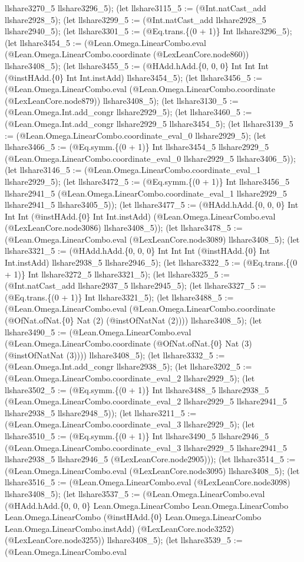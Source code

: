 \documentclass[11pt]{article}
\begin{document}
llshare3270\_5 llshare3296\_5); (let llshare3115\_5 := (@Int.natCast\_add llshare2928\_5); (let llshare3299\_5 := (@Int.natCast\_add llshare2928\_5 llshare2940\_5); (let llshare3301\_5 := (@Eq.trans.\{(0 + 1)\} Int llshare3296\_5); (let llshare3454\_5 := (@Lean.Omega.LinearCombo.eval (@Lean.Omega.LinearCombo.coordinate (@LexLeanCore.node860)) llshare3408\_5); (let llshare3455\_5 := (@HAdd.hAdd.\{0, 0, 0\} Int Int Int (@instHAdd.\{0\} Int Int.instAdd) llshare3454\_5); (let llshare3456\_5 := (@Lean.Omega.LinearCombo.eval (@Lean.Omega.LinearCombo.coordinate (@LexLeanCore.node879)) llshare3408\_5); (let llshare3130\_5 := (@Lean.Omega.Int.add\_congr llshare2929\_5); (let llshare3460\_5 := (@Lean.Omega.Int.add\_congr llshare2929\_5 llshare3454\_5); (let llshare3139\_5 := (@Lean.Omega.LinearCombo.coordinate\_eval\_0 llshare2929\_5); (let llshare3466\_5 := (@Eq.symm.\{(0 + 1)\} Int llshare3454\_5 llshare2929\_5 (@Lean.Omega.LinearCombo.coordinate\_eval\_0 llshare2929\_5 llshare3406\_5)); (let llshare3146\_5 := (@Lean.Omega.LinearCombo.coordinate\_eval\_1 llshare2929\_5); (let llshare3472\_5 := (@Eq.symm.\{(0 + 1)\} Int llshare3456\_5 llshare2941\_5 (@Lean.Omega.LinearCombo.coordinate\_eval\_1 llshare2929\_5 llshare2941\_5 llshare3405\_5)); (let llshare3477\_5 := (@HAdd.hAdd.\{0, 0, 0\} Int Int Int (@instHAdd.\{0\} Int Int.instAdd) (@Lean.Omega.LinearCombo.eval (@LexLeanCore.node3086) llshare3408\_5)); (let llshare3478\_5 := (@Lean.Omega.LinearCombo.eval (@LexLeanCore.node3089) llshare3408\_5); (let llshare3321\_5 := (@HAdd.hAdd.\{0, 0, 0\} Int Int Int (@instHAdd.\{0\} Int Int.instAdd) llshare2938\_5 llshare2946\_5); (let llshare3322\_5 := (@Eq.trans.\{(0 + 1)\} Int llshare3272\_5 llshare3321\_5); (let llshare3325\_5 := (@Int.natCast\_add llshare2937\_5 llshare2945\_5); (let llshare3327\_5 := (@Eq.trans.\{(0 + 1)\} Int llshare3321\_5); (let llshare3488\_5 := (@Lean.Omega.LinearCombo.eval (@Lean.Omega.LinearCombo.coordinate (@OfNat.ofNat.\{0\} Nat (2) (@instOfNatNat (2)))) llshare3408\_5); (let llshare3490\_5 := (@Lean.Omega.LinearCombo.eval (@Lean.Omega.LinearCombo.coordinate (@OfNat.ofNat.\{0\} Nat (3) (@instOfNatNat (3)))) llshare3408\_5); (let llshare3332\_5 := (@Lean.Omega.Int.add\_congr llshare2938\_5); (let llshare3202\_5 := (@Lean.Omega.LinearCombo.coordinate\_eval\_2 llshare2929\_5); (let llshare3502\_5 := (@Eq.symm.\{(0 + 1)\} Int llshare3488\_5 llshare2938\_5 (@Lean.Omega.LinearCombo.coordinate\_eval\_2 llshare2929\_5 llshare2941\_5 llshare2938\_5 llshare2948\_5)); (let llshare3211\_5 := (@Lean.Omega.LinearCombo.coordinate\_eval\_3 llshare2929\_5); (let llshare3510\_5 := (@Eq.symm.\{(0 + 1)\} Int llshare3490\_5 llshare2946\_5 (@Lean.Omega.LinearCombo.coordinate\_eval\_3 llshare2929\_5 llshare2941\_5 llshare2938\_5 llshare2946\_5 (@LexLeanCore.node2905))); (let llshare3514\_5 := (@Lean.Omega.LinearCombo.eval (@LexLeanCore.node3095) llshare3408\_5); (let llshare3516\_5 := (@Lean.Omega.LinearCombo.eval (@LexLeanCore.node3098) llshare3408\_5); (let llshare3537\_5 := (@Lean.Omega.LinearCombo.eval (@HAdd.hAdd.\{0, 0, 0\} Lean.Omega.LinearCombo Lean.Omega.LinearCombo Lean.Omega.LinearCombo (@instHAdd.\{0\} Lean.Omega.LinearCombo Lean.Omega.LinearCombo.instAdd) (@LexLeanCore.node3252) (@LexLeanCore.node3255)) llshare3408\_5); (let llshare3539\_5 := (@Lean.Omega.LinearCombo.eval 
\end{document}
